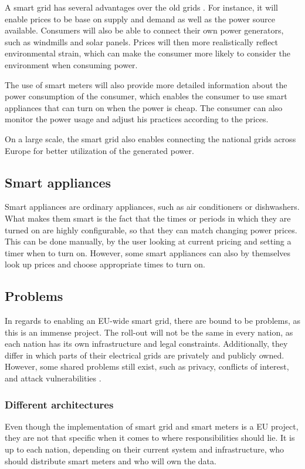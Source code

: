 A smart grid has several advantages over the old grids \cite{smartgrid_gov, directive_2009_72_EC}.
For instance, it will enable prices to be base on supply and demand as well as the power source available.
Consumers will also be able to connect their own power generators, such as windmills and solar panels.
Prices will then more realistically reflect environmental strain, which can make the consumer more likely to consider the environment when consuming power.

The use of smart meters will also provide more detailed information about the power consumption of the consumer, which enables the consumer to use smart appliances that can turn on when the power is cheap.
The consumer can also monitor the power usage and adjust his practices according to the prices.

On a large scale, the smart grid also enables connecting the national grids across Europe for better utilization of the generated power.


\subsection{Smart appliances}
\label{background:smart_appliances}
Smart appliances\cite{smart_appliances} are ordinary appliances, such as air conditioners or dishwashers.
What makes them smart is the fact that the times or periods in which they are turned on are highly configurable, so that they can match changing power prices.
This can be done manually, by the user looking at current pricing and setting a timer when to turn on.
However, some smart appliances can also by themselves look up prices and choose appropriate times to turn on.

\subsection{Problems}
In regards to enabling an EU-wide smart grid, there are bound to be problems, as this is an immense project.
The roll-out will not be the same in every nation, as each nation has its own infrastructure and legal constraints.
Additionally, they differ in which parts of their electrical grids are privately and publicly owned.
However, some shared problems still exist, such as privacy, conflicts of interest, and attack vulnerabilities \cite{offswitch, smart_meter_survey, security_economics}.

\subsubsection{Different architectures}
Even though the implementation of smart grid and smart meters is a EU project, they are not that specific when it comes to where responsibilities should lie.
It is up to each nation, depending on their current system and infrastructure, who should distribute smart meters and who will own the data.

